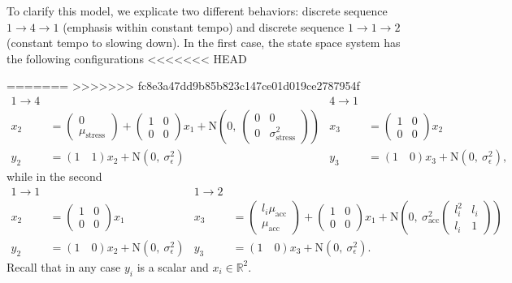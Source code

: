 \documentclass[aoas]{imsart}
\begin{document}
To clarify this model, we explicate two different behaviors: discrete
sequence $1\rightarrow 4\rightarrow 1$ (emphasis within constant tempo) and discrete sequence
$1\rightarrow 1\rightarrow 2$ (constant tempo to slowing down). In the
first case, the state space system has the following configurations
<<<<<<< HEAD

=======
>>>>>>> fc8e3a47dd9b85b823c147ce01d019ce2787954f
{\footnotesize
\begin{align*}
  1\rightarrow 4 && 4\rightarrow 1\\
  x_{2} &= \begin{pmatrix} 0\\ \mu_{\textrm{stress}} \end{pmatrix}
  + \begin{pmatrix}1&0\\0&0\end{pmatrix} x_{1} +
                           \mbox{N}\left(0,\ \begin{pmatrix}0&0\\0&\sigma_{\textrm{stress}}^2\end{pmatrix}\right)
        &   x_{3}
                    &= 
  \begin{pmatrix}1&0\\0&0\end{pmatrix} x_{2} \\
  y_2 &= (1\quad  1)  x_2 + \mbox{N}(0,\
                                 \sigma_\epsilon^2) &
y_3 &= (1\quad  0) x_3 + \mbox{N}(0,\
                                 \sigma_\epsilon^2),
\end{align*}
}%
while in the second
{\footnotesize
\begin{align*}
  1\rightarrow 1 && 1\rightarrow 2\\
  x_{2} &= 
  \begin{pmatrix}1&0\\0&0\end{pmatrix} x_{1} 
        &   x_{3}
                    &= \begin{pmatrix} l_i\mu_{\textrm{acc}}\\ \mu_{\textrm{acc}}\end{pmatrix} +
  \begin{pmatrix}1&0\\0&0\end{pmatrix} x_{1} +
                         \mbox{N}\left(0,\ \sigma_{\textrm{acc}}^2\begin{pmatrix} l_i^2 & l_i\\ l_i & 1 \end{pmatrix}\right)\\
  y_2 &= (1\quad  0)  x_2 + \mbox{N}(0,\
                                 \sigma_\epsilon^2) &
y_3 &= (1\quad  0) x_3 + \mbox{N}(0,\
                                 \sigma_\epsilon^2).
\end{align*}
}%
Recall that in any case $y_i$ is a scalar and $x_i \in \mathbb{R}^2$.
\end{document}
